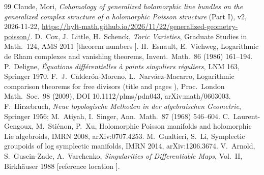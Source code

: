\begin{thebibliography}{99}\small
{} Claude, Mori, \emph{Cohomology of generalized holomorphic line bundles on the generalized complex structure of a holomorphic Poisson structure} (Part I), v2, 2026-11-22, \url{https://hylt-math.github.io/2026/11/22/generalized-geometry-poisson/}.
 D.\ Cox, J.\ Little, H.\ Schenck, \emph{Toric Varieties}, Graduate Studies in Math.\ 124, AMS 2011 [theorem numbers \tQ].
 H.\ Esnault, E.\ Viehweg, Logarithmic de Rham complexes and vanishing theorems, Invent.\ Math.\ 86 (1986) 161--194.
 P.\ Deligne, \emph{\'Equations diff\'erentielles \`a points singuliers r\'eguliers}, LNM 163, Springer 1970.
 F.\ J.\ Calder\'on-Moreno, L.\ Narv\'aez-Macarro, Logarithmic comparison theorems for free divisors (title and pages \tQ), Proc.\ London Math.\ Soc.\ 98 (2009), DOI 10.1112/plms/pdn043, arXiv:math/0603003.
 F.\ Hirzebruch, \emph{Neue topologische Methoden in der algebraischen Geometrie}, Springer 1956; M.\ Atiyah, I.\ Singer, Ann.\ Math.\ 87 (1968) 546--604.
 C.\ Laurent-Gengoux, M.\ Sti\'enon, P.\ Xu, Holomorphic Poisson manifolds and holomorphic Lie algebroids, IMRN 2008, arXiv:0707.4253.
 M.\ Gualtieri, S.\ Li, Symplectic groupoids of log symplectic manifolds, IMRN 2014, arXiv:1206.3674.
 V.\ Arnold, S.\ Gusein-Zade, A.\ Varchenko, \emph{Singularities of Differentiable Maps}, Vol.\ II, Birkh\"auser 1988 [reference location \tQ].
\end{thebibliography}
